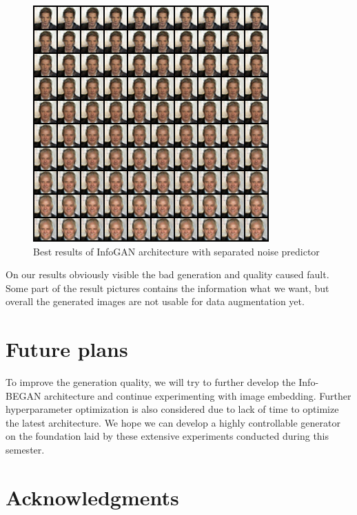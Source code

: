 \documentclass[10pt,journal,compsoc]{IEEEtran}
\begin{document}
\begin{figure}[h]
	\centering
	\includegraphics[width=1\linewidth]{pic/predict_everything}
	\caption{Best results of InfoGAN architecture with separated noise predictor}
	\label{fig:best3}
\end{figure}

On our results obviously visible the bad generation and quality caused fault. Some part of the result pictures contains the information what we want, but overall the generated images are not usable for data augmentation yet.

\section{Future plans}
To improve the generation quality, we will try to further develop the Info-BEGAN architecture and continue experimenting with image embedding. Further hyperparameter optimization is also considered due to lack of time to optimize the latest architecture. We hope we can develop a highly controllable generator on the foundation laid by these extensive experiments conducted during this semester.


\ifCLASSOPTIONcompsoc
  \section*{Acknowledgments}
\else
\end{document}
